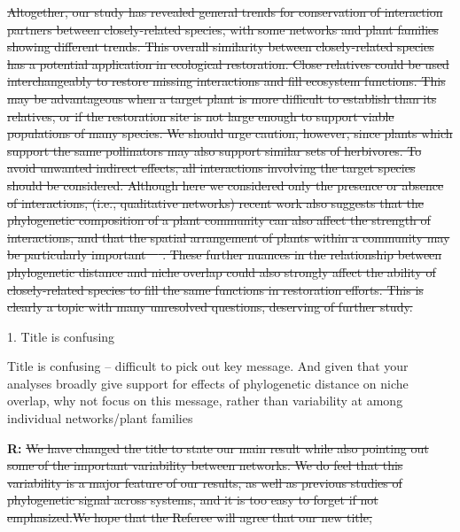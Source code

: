 \documentclass[12pt]{letter}
\newenvironment{refquote}{\bigskip \begin{it}}{\end{it}\smallskip}
\providecommand{\DIFdel}[1]{{\protect\color{red}\sout{#1}}}                      %
\providecommand{\DIFaddbegin}{} %
\providecommand{\DIFdelbegin}{} %
\providecommand{\DIFdelend}{} %
\newcommand{\DIFscaledelfig}{0.5}
\newlength{\DIFdelgraphicswidth} %
\newlength{\DIFdelgraphicsheight} %
\newcommand{\DIFaddincludegraphics}[2][]{{\color{blue}\fbox{\DIFOincludegraphics[#1]{#2}}}} %
\newcommand{\DIFdelincludegraphics}[2][]{%
\sbox{\DIFdelgraphicsbox}{\DIFOincludegraphics[#1]{#2}}%
\settoboxwidth{\DIFdelgraphicswidth}{\DIFdelgraphicsbox} %
\settoboxtotalheight{\DIFdelgraphicsheight}{\DIFdelgraphicsbox} %
\scalebox{\DIFscaledelfig}{%
\parbox[b]{\DIFdelgraphicswidth}{\usebox{\DIFdelgraphicsbox}\\[-\baselineskip] \rule{\DIFdelgraphicswidth}{0em}}\llap{\resizebox{\DIFdelgraphicswidth}{\DIFdelgraphicsheight}{%
\setlength{\unitlength}{\DIFdelgraphicswidth}%
\begin{picture}(1,1)%
\thicklines\linethickness{2pt} %
{\color[rgb]{1,0,0}\put(0,0){\framebox(1,1){}}}%
{\color[rgb]{1,0,0}\put(0,0){\line( 1,1){1}}}%
{\color[rgb]{1,0,0}\put(0,1){\line(1,-1){1}}}%
\end{picture}%
}\hspace*{3pt}}} %
} %
\DeclareRobustCommand{\DIFaddbegin}{\DIFOaddbegin \let\includegraphics\DIFaddincludegraphics} %
\DeclareRobustCommand{\DIFdelbegin}{\DIFOdelbegin \let\includegraphics\DIFdelincludegraphics} %
\DeclareRobustCommand{\DIFdelend}{\DIFOaddend \let\includegraphics\DIFOincludegraphics} %
\begin{document}
\DIFdel{Altogether, our study has revealed general trends for conservation of interaction
		partners between closely-related species, with some networks and plant 
		families showing different trends. This overall similarity between closely-related
		species has a potential application in ecological restoration. Close relatives could
		be used interchangeably to restore missing interactions and fill ecosystem functions. 
		This may be advantageous when a target plant is more difficult to establish than its
		relatives, or if the restoration site is not large enough to support viable populations 
		of many species. We should urge caution, however, since plants which support the
		same pollinators may also support similar sets of herbivores. To avoid unwanted 
		indirect effects, all interactions involving the target species should be considered.
		Although here we considered only the presence or absence of interactions,
		(i.e., qualitative networks)
		recent work also suggests that the phylogenetic composition of a plant
		community can also affect the strength of 
		interactions, and that the spatial arrangement of plants within a 
		community may be particularly important~\mbox{%
\citep{Yguel2011,Castagneyrol2014}}\hspace{0pt}%
.
		These further nuances in the relationship between phylogenetic distance and 
		niche overlap could also strongly affect the ability of closely-related species to
		fill the same functions in restoration efforts. This is clearly a topic with many
		unresolved questions, deserving of further study.
}%


\DIFdelend 1. Title is confusing

		\begin{refquote}
			Title is confusing – difficult to pick out key message. And given that your analyses broadly give support for effects of phylogenetic distance on niche overlap, why not focus on this message, rather than variability at among individual networks/plant families
		\end{refquote}


		\textbf{R:} 
\DIFdelbegin \DIFdel{We have changed the title to state our main result while also pointing out some of the important variability between networks. We do feel that this variability is a major feature of our results, as well as previous studies of phylogenetic signal across systems, and it is too easy to forget if not emphasized.We hope that the Referee will agree that our new title, }\DIFdelend \DIFaddbegin 
\end{document}
